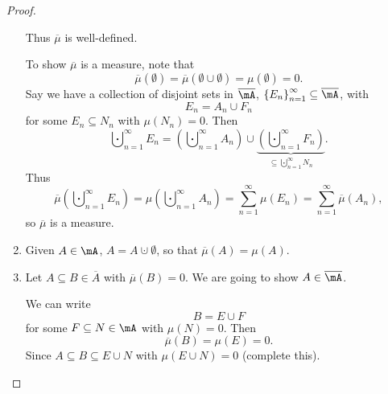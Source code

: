 \documentclass[pmath451]{subfiles}
\begin{document}
\begin{proof}
\begin{enumerate}
                Thus $\overline{\mu}$ is well-defined.

                To show $\overline{\mu}$ is a measure, note that
                \begin{equation*}
                    \overline{\mu}\left( \emptyset \right) = \overline{\mu}\left( \emptyset\cup\emptyset  \right) = \mu\left( \emptyset \right) = 0.
                \end{equation*}
                Say we have a collection of disjoint sets in $\overline{\mA}$, $\left\lbrace E_n \right\rbrace^{\infty}_{n=1}\subseteq\overline{\mA}$, with
                \begin{equation*}
                    E_n = A_n \cup F_n
                \end{equation*}
                for some $E_n\subseteq N_n$ with $\mu\left( N_n \right) = 0$. Then
                \begin{equation*}
                    \bigcupdot^{\infty}_{n=1} E_n = \left( \bigcupdot^{\infty}_{n=1} A_n \right) \cup \underbrace{\left( \bigcupdot^{\infty}_{n=1} F_n \right)}_{\subseteq \bigcupdot^{\infty}_{n=1} N_n}.
                \end{equation*}
                Thus
                \begin{equation*}
                    \overline{\mu}\left( \bigcupdot^{\infty}_{n=1}E_n \right) = \mu\left( \bigcupdot^{\infty}_{n=1}A_n \right) = \sum^{\infty}_{n=1} \mu\left( E_n \right) = \sum^{\infty}_{n=1}\overline{\mu}\left( A_n \right),
                \end{equation*}
                so $\overline{\mu}$ is a measure.

            \item Given $A\in\mA$, $A=A\cupdot\emptyset$, so that $\overline{\mu}\left( A \right) = \mu\left( A \right)$.

            \item Let $A\subseteq B\in\overline{A}$ with $\overline{\mu}\left( B \right) = 0$. We are going to show $A\in\overline{\mA}$.

                We can write
                \begin{equation*}
                    B = E\cup F
                \end{equation*}
                for some $F\subseteq N\in\mA$ with $\mu\left( N \right)=0$. Then
                \begin{equation*}
                    \overline{\mu}\left( B \right) = \mu\left( E \right) = 0.
                \end{equation*}
                Since $A\subseteq B\subseteq E\cup N$ with $\mu\left( E\cup N \right) = 0$ (complete this).
        \end{enumerate}
    \end{proof}
\end{document}
